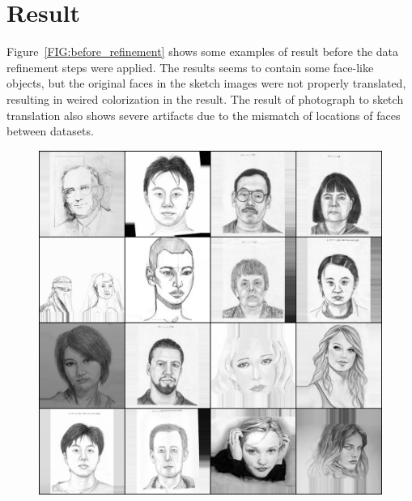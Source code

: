 \chapter{Result}\label{Ch:Result}

Figure~\ref{FIG:before_refinement} shows some examples of result before the data refinement steps were applied. The results seems to contain some face-like objects, but the original faces in the sketch images were not properly translated, resulting in weired colorization in the result. The result of photograph to sketch translation also shows severe artifacts due to the mismatch of locations of faces between datasets.

\begin{figure}[ht]
    \begin{center}
    \includegraphics[scale=0.16]{Graphics/ske2pic_origin_before_clean.png}

\end{center}
\end{figure}
